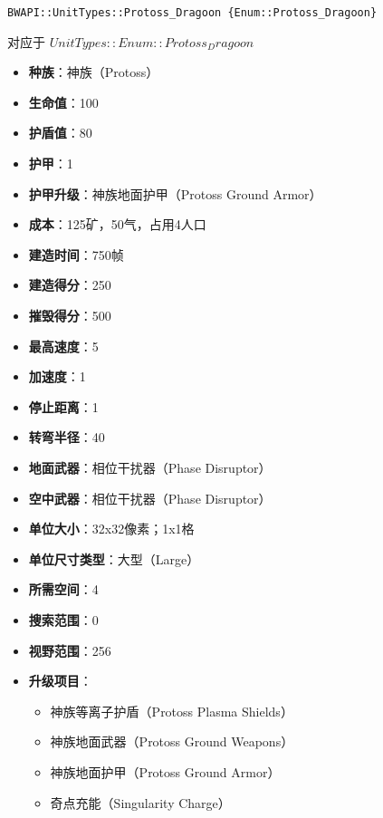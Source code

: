 \begin{tcolorbox}[colback=white, colframe=black!60!white, title=Protoss\_Dragoon(), arc=0mm]
    \begin{verbatim}
BWAPI::UnitTypes::Protoss_Dragoon {Enum::Protoss_Dragoon}
    \end{verbatim}
    对应于  $ UnitTypes::Enum::Protoss_Dragoon $ 
    \begin{itemize}
        \item \textbf{种族}：神族（Protoss）
        \item \textbf{生命值}：100
        \item \textbf{护盾值}：80
        \item \textbf{护甲}：1
        \item \textbf{护甲升级}：神族地面护甲（Protoss Ground Armor）
        \item \textbf{成本}：125矿，50气，占用4人口
        \item \textbf{建造时间}：750帧
        \item \textbf{建造得分}：250
        \item \textbf{摧毁得分}：500
        \item \textbf{最高速度}：5
        \item \textbf{加速度}：1
        \item \textbf{停止距离}：1
        \item \textbf{转弯半径}：40
        \item \textbf{地面武器}：相位干扰器（Phase Disruptor）
        \item \textbf{空中武器}：相位干扰器（Phase Disruptor）
        \item \textbf{单位大小}：32x32像素；1x1格
        \item \textbf{单位尺寸类型}：大型（Large）
        \item \textbf{所需空间}：4
        \item \textbf{搜索范围}：0
        \item \textbf{视野范围}：256
        \item \textbf{升级项目}：
            \begin{itemize}
                \item 神族等离子护盾（Protoss Plasma Shields）
                \item 神族地面武器（Protoss Ground Weapons）
                \item 神族地面护甲（Protoss Ground Armor）
                \item 奇点充能（Singularity Charge）

\end{itemize}
\end{itemize}
\end{tcolorbox}
